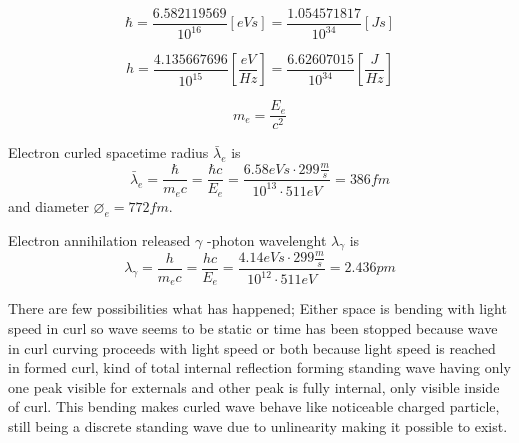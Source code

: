 \begin{equation} \label{eq:reduced_plank_constant} 
	\hbar
	= \frac{6.582119569}{10^{16}}[eVs]
	= \frac{1.054571817}{10^{34}}[Js]
\end{equation}

\begin{equation} \label{eq:plank_constant} %
	h
	= \frac{4.135667696}{10^{15}}\left[\frac{eV}{Hz}\right]
	= \frac{6.62607015}{10^{34}}\left[\frac{J}{Hz}\right]
\end{equation}

\begin{equation} \label{eq:electron_rest_mass}
	m_e=\frac{E_e}{c^2}
\end{equation}

Electron curled spacetime radius $\bar{\lambda}_e$ is
\begin{equation} \label{eq:gamma_lenght} %
	\bar{\lambda}_e=\frac{\hbar}{m_ec}
	=\frac{\hbar c}{E_e}
	=\frac{6.58eVs\cdot299\frac{m}{s}}{10^{13}\cdot511eV}
	=386fm
\end{equation}
and diameter $\diameter_e=772 fm$.


Electron annihilation released $\gamma$ -photon wavelenght $\lambda_\gamma$ is
\begin{equation} \label{eq:gamma_lenght} %
	\lambda_\gamma=\frac{h}{m_ec}
	=\frac{hc}{E_e}
	=\frac{4.14eVs\cdot299\frac{m}{s}}{10^{12}\cdot511eV}
	=2.436pm
\end{equation}

There are few possibilities what has happened; Either space is bending with
light speed in curl so wave seems to be static or time has been stopped
because wave in curl curving proceeds with light speed or both because light
speed is reached in formed curl, kind of total internal reflection forming
standing wave having only one peak visible for externals and other peak is
fully internal, only visible inside of curl. This bending makes curled wave
behave like noticeable charged particle, still being a discrete standing wave
due to unlinearity making it possible to exist.

